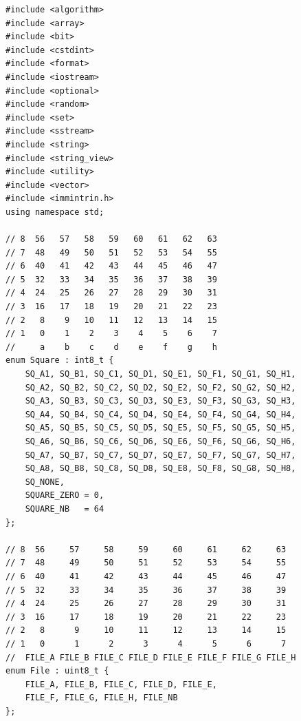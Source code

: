\documentclass[12pt,a4paper,twoside,openright]{book}
\begin{document}
\begin{mdframed}[skipabove=\baselineskip,topline=false,rightline=false,bottomline=false,leftline=false,linewidth=1pt,linecolor=gray!40,innerleftmargin=8pt]
\begin{verbatim}
#include <algorithm>
#include <array>
#include <bit>
#include <cstdint>
#include <format>
#include <iostream>
#include <optional>
#include <random>
#include <set>
#include <sstream>
#include <string>
#include <string_view>
#include <utility>
#include <vector>
#include <immintrin.h>
using namespace std;

// 8  56   57   58   59   60   61   62   63
// 7  48   49   50   51   52   53   54   55
// 6  40   41   42   43   44   45   46   47
// 5  32   33   34   35   36   37   38   39
// 4  24   25   26   27   28   29   30   31
// 3  16   17   18   19   20   21   22   23
// 2   8    9   10   11   12   13   14   15
// 1   0    1    2    3    4    5    6    7
//     a    b    c    d    e    f    g    h
enum Square : int8_t {
    SQ_A1, SQ_B1, SQ_C1, SQ_D1, SQ_E1, SQ_F1, SQ_G1, SQ_H1,
    SQ_A2, SQ_B2, SQ_C2, SQ_D2, SQ_E2, SQ_F2, SQ_G2, SQ_H2,
    SQ_A3, SQ_B3, SQ_C3, SQ_D3, SQ_E3, SQ_F3, SQ_G3, SQ_H3,
    SQ_A4, SQ_B4, SQ_C4, SQ_D4, SQ_E4, SQ_F4, SQ_G4, SQ_H4,
    SQ_A5, SQ_B5, SQ_C5, SQ_D5, SQ_E5, SQ_F5, SQ_G5, SQ_H5,
    SQ_A6, SQ_B6, SQ_C6, SQ_D6, SQ_E6, SQ_F6, SQ_G6, SQ_H6,
    SQ_A7, SQ_B7, SQ_C7, SQ_D7, SQ_E7, SQ_F7, SQ_G7, SQ_H7,
    SQ_A8, SQ_B8, SQ_C8, SQ_D8, SQ_E8, SQ_F8, SQ_G8, SQ_H8,
    SQ_NONE,
    SQUARE_ZERO = 0,
    SQUARE_NB   = 64
};

// 8  56     57     58     59     60     61     62     63
// 7  48     49     50     51     52     53     54     55
// 6  40     41     42     43     44     45     46     47
// 5  32     33     34     35     36     37     38     39
// 4  24     25     26     27     28     29     30     31
// 3  16     17     18     19     20     21     22     23
// 2   8      9     10     11     12     13     14     15
// 1   0      1      2      3      4      5      6      7
//  FILE_A FILE_B FILE_C FILE_D FILE_E FILE_F FILE_G FILE_H
enum File : uint8_t {
    FILE_A, FILE_B, FILE_C, FILE_D, FILE_E, 
    FILE_F, FILE_G, FILE_H, FILE_NB
};


\end{verbatim}
\end{mdframed}
\end{document}
